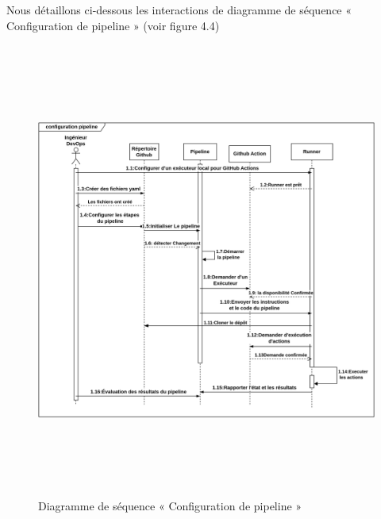             \textsf{Nous détaillons ci-dessous les interactions de diagramme de séquence « Configuration de pipeline » (voir figure 4.4)  }
            \begin{figure}[H]
                \begin{center}
                \includegraphics[height=15cm,width=18cm]{SEQPIPELINE.png}
                \end{center}
                \caption{Diagramme de séquence « Configuration de pipeline »}
                \end{figure}
            
